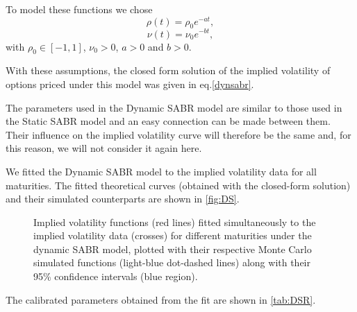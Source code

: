 To model these functions we chose
\begin{equation}
\rho(t)=\rho_0e^{-at},
\end{equation}
\begin{equation}
\nu(t)=\nu_0e^{-bt},
\end{equation}
\noindent with $\rho_0\in[-1,1]$, $\nu_0>0$, $a>0$ and $b>0$.

With these assumptions, the closed form solution of the implied volatility of options priced under this model was given in eq.\eqref{dynsabr}.

The parameters used in the Dynamic SABR model are similar to those used in the Static SABR model and an easy connection can be made between them. Their influence on the implied volatility curve will therefore be the same and, for this reason, we will not consider it again here.

We fitted the Dynamic SABR model to the implied volatility data for all maturities. The fitted theoretical curves (obtained with the closed-form solution) and their simulated counterparts are shown in \autoref{fig:DS}.




\begin{figure}[H]
  \begin{subfigmatrix}{2}
  \end{subfigmatrix}
  \caption[Implied volatility functions fitted simultaneously to the implied volatility data for different maturities under the dynamic SABR model, plotted with their respective Monte Carlo simulated functions along with their 95\% confidence intervals.]{Implied volatility functions (red lines) fitted simultaneously to the implied volatility data (crosses) for different maturities under the dynamic SABR model, plotted with their respective Monte Carlo simulated functions (light-blue dot-dashed lines) along with their 95\% confidence intervals (blue region).}
  \label{fig:DS}
\end{figure}

The calibrated parameters obtained from the fit are shown in \autoref{tab:DSR}.

